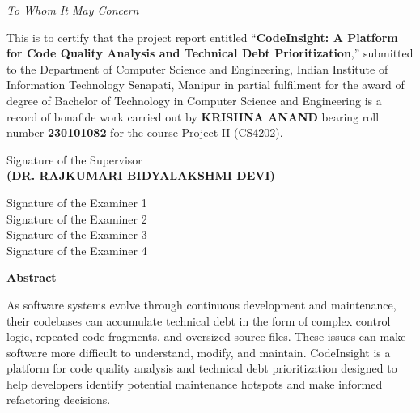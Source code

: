 \documentclass[12pt,a4paper]{report}
\begin{document}
\vspace{1.8cm}
\begin{center}
    {\Large \textit{To Whom It May Concern}\par}
\end{center}
\vspace{1.2cm}

This is to certify that the project report entitled ``\textbf{CodeInsight: A Platform for Code Quality Analysis and Technical Debt Prioritization},'' submitted to the Department of Computer Science and Engineering, Indian Institute of Information Technology Senapati, Manipur in partial fulfilment for the award of degree of Bachelor of Technology in Computer Science and Engineering is a record of bonafide work carried out by \textbf{KRISHNA ANAND} bearing roll number \textbf{230101082} for the course Project II (CS4202).

\vspace{2.8cm}
\begin{flushright}
Signature of the Supervisor\\[0.2cm]
\textbf{(DR. RAJKUMARI BIDYALAKSHMI DEVI)}
\end{flushright}

\vspace{1.8cm}
\noindent Signature of the Examiner 1 \dotfill\\[0.3cm]
\noindent Signature of the Examiner 2 \dotfill\\[0.3cm]
\noindent Signature of the Examiner 3 \dotfill\\[0.3cm]
\noindent Signature of the Examiner 4 \dotfill

\newpage
\thispagestyle{plain}
{}
\begin{center}
    {\LARGE \textbf{Abstract}\par}
\end{center}
\vspace{1.0cm}

As software systems evolve through continuous development and maintenance, their codebases can accumulate technical debt in the form of complex control logic, repeated code fragments, and oversized source files. These issues can make software more difficult to understand, modify, and maintain. CodeInsight is a platform for code quality analysis and technical debt prioritization designed to help developers identify potential maintenance hotspots and make informed refactoring decisions.
\end{document}
